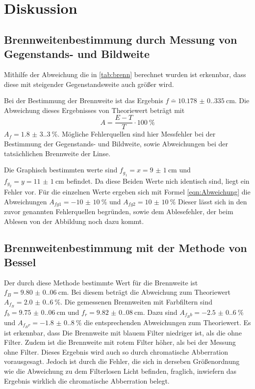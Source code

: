 \section{Diskussion}
\label{sec:Diskussion}
\subsection{Brennweitenbestimmung durch Messung von Gegenstands- und Bildweite}
Mithilfe der Abweichung die in \ref{tab:brenn} berechnet wurden ist erkennbar, dass diese mit steigender Gegenstandsweite auch größer wird.

Bei der Bestimmung der Brennweite ist das Ergebnis $f \bar=\qty{10.178(0.335)}{\centi\meter}$. 
Die Abweichung dieses Ergebnisses von Theoriewert beträgt mit 
\begin{equation}
    A=\frac{E-T}{T} \cdot \qty{100}{\percent}
    \label{eqn:Abweichung}
\end{equation}
$A_f=\qty{1.8(3.3)}{\percent}$.
Mögliche Fehlerquellen sind hier Messfehler bei der Bestimmung der Gegenstands- und Bildweite, sowie Abweichungen bei der tatsächlichen Brennweite der Linse.

Die Graphisch bestimmten werte sind $f_{g_1}=x=\qty{9(1)}{\centi\meter}$ und $f_{g_2}=y=\qty{11(1)}{\centi\meter}$ befindet.
Da diese Beiden Werte nich identisch sind, liegt ein Fehler vor.
Für die einzelnen Werte ergeben sich mit Formel \ref{eqn:Abweichung} die Abweichungen $A_{fg1}=\qty{-10(10)}{\percent}$ und $A_{fg2}=\qty{10(10)}{\percent}$
Dieser lässt sich in den zuvor genannten Fehlerquellen begründen, sowie dem Ablesefehler, der beim Ablesen von der Abbildung noch dazu kommt.

\subsection{Brennweitenbestimmung mit der Methode von Bessel}
Der durch diese Methode bestimmte Wert für die Brennweite ist $f_{B}=\qty{9.80(0.06)}{\centi\meter}$.
Bei diesem beträgt die Abweichung zum Theoriewert $A_{f_B}=\qty{2.0(0.6)}{\percent}$.
Die gemessenen Brennweiten mit Farbfiltern sind $f_b=\qty{9.75(0.06)}{\centi\meter}$ und $f_r=\qty{9.82(0.08)}{\centi\meter}$.
Dazu sind $A_{f_Bb}=\qty{-2.5(0.6)}{\percent}$ und $A_{f_Br}=\qty{-1.8(0.8)}{\percent}$ die entsprechenden Abweichungen zum Theoriewert.
Es ist erkennbar, dass Die Brennweite mit blauem Filter niedriger ist, als die ohne Filter.
Zudem ist die Brennweite mit rotem Filter höher, als bei der Messung ohne Filter.
Dieses Ergebnis wird auch so durch chromatische Abberration vorausgesagt.
Jedoch ist durch die Fehler, die sich in derseben Größenordnung wie die Abweichung zu dem Filterlosen Licht befinden, fraglich, inwiefern das Ergebnis wirklich die chromatische Abberration belegt.


